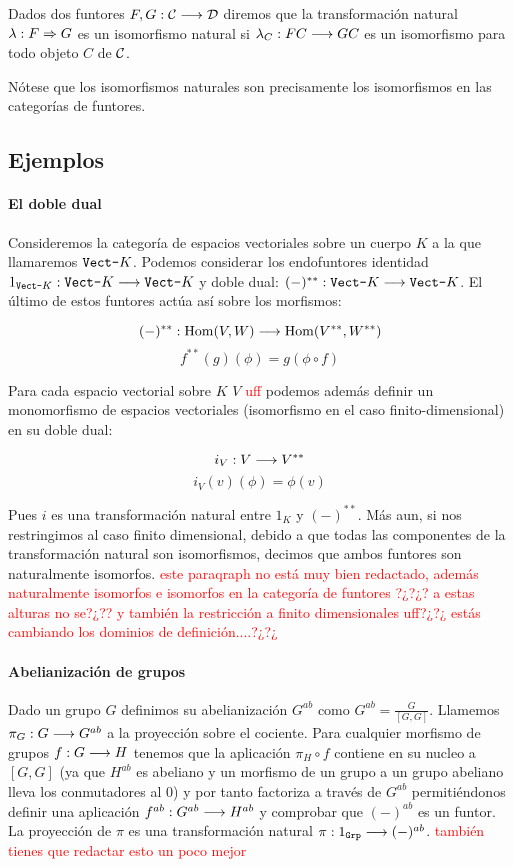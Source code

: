 \begin{definition}
  Dados dos funtores $F, G : \mathcal{C}\longrightarrow \mathcal{D}$ diremos que la transformación
  natural $\lambda : F\Rightarrow G$ es un isomorfismo natural si
  $\lambda_C : FC\longrightarrow GC$ es un isomorfismo para todo objeto $C$
  de $\mathcal{C}$.
\end{definition}

Nótese que los isomorfismos naturales son precisamente los isomorfismos
en las categorías de funtores.

\subsection{Ejemplos}
\paragraph{El doble dual}
Consideremos la categoría de espacios vectoriales sobre un cuerpo
$K$ a la que llamaremos $\texttt{Vect-}K$. Podemos considerar los endofuntores
identidad $1_{\texttt{Vect-}K} : \texttt{Vect-}K\longrightarrow \texttt{Vect-}K$ y  doble dual:
$(-)^{**} : \texttt{Vect-}K\longrightarrow \texttt{Vect-}K$. El último de estos funtores actúa
así sobre los morfismos:

$$(-)^{**} : \operatorname{Hom}(V, W)\longrightarrow \operatorname{Hom}(V^{**}, W^{**})$$
$$f^{**}(g)(\phi) = g(\phi \circ f)$$

Para cada espacio vectorial sobre $K$ $V$ \textcolor{red}{uff} podemos además
definir un monomorfismo de espacios vectoriales
 (isomorfismo
en el caso finito-dimensional) en su doble dual:

\begin{equation*}
i_V : V\longrightarrow V^{**}
\end{equation*}
\begin{equation*}
i_V(v)(\phi) = \phi(v)
\end{equation*}

Pues $i$ es una transformación natural entre $1_K$ y
$(-)^{**}$. Más aun, si nos restringimos al caso finito dimensional,
debido a que todas las componentes de la transformación natural
son isomorfismos, decimos que ambos funtores son naturalmente isomorfos. \textcolor{red}{este paraqraph no está muy bien redactado, además naturalmente isomorfos e isomorfos en la categoría de funtores ?¿?¿? a estas alturas no se?¿?? y también la restricción a finito dimensionales uff?¿?¿ estás cambiando los dominios de definición....?¿?¿}

\paragraph{Abelianización de grupos}
Dado un grupo $G$ definimos su abelianización $G^{ab}$ como
$G^{ab} = \frac{G}{[G, G]}$. Llamemos $\pi_G : G\longrightarrow G^{ab}$
a la proyección sobre el cociente. Para cualquier morfismo
de grupos $f : G\longrightarrow H$ tenemos que la aplicación
$\pi_H \circ f$ contiene en su nucleo a $[G, G]$ (ya que
$H^{ab}$ es abeliano y un morfismo de un grupo a un grupo abeliano
lleva los conmutadores al 0) y por tanto factoriza a través
de $G^{ab}$ permitiéndonos definir una aplicación
$f^{ab} : G^{ab}\longrightarrow H^{ab}$ y comprobar
que $(-)^{ab}$ es un funtor. La proyección de $\pi$ es una transformación
natural $\pi : 1_{\texttt{Grp}} \longrightarrow  (-)^{ab}$. \textcolor{red}{también tienes que redactar esto un poco mejor}
